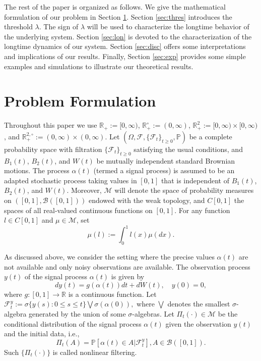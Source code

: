 \documentclass[12pt]{amsart}
\theoremstyle{remark}
\numberwithin{equation}{section}
\newcommand{\M}{\mathcal{M}}
\newcommand{\F}{\mathcal{F}}
\newcommand{\PP}{\mathbb{P}}
\newcommand{\R}{\mathbb{R}}
\numberwithin{equation}{section}
\newcommand{\1}{\boldsymbol{1}}
\begin{document}
The rest of the paper is organized as follows. We give the mathematical formulation of our problem in Section \ref{secpre}.
Section \ref{sec:thres} introduces the threshold $\lambda$. The sign of $\lambda$ will be used to characterize the longtime behavior of the underlying system.
Section \ref{sec:lon} is devoted to the characterization of the longtime dynamics of our system. Section \ref{sec:disc} offers
some interpretations and implications of our results.
Finally, Section \ref{sec:exp} provides some simple examples and simulations to illustrate our theoretical results.

\section {%
Problem
Formulation}\label{secpre}

Throughout this paper we use
$\R_+:=[0,\infty)$, $\R^\circ_+:=(0,\infty)$,
$\R_+^2:=[0,\infty) \times [0,\infty)$, and $\R^{2,\circ}_+:=(0,\infty)\times (0,\infty)$.
Let $(\Omega,\F,\{\F_t\}_{t\geq0},\PP)$ be a complete probability space with filtration $\{\F_t\}_{t\geq0}$ satisfying the usual conditions, and $B_1(t)$, $B_2(t)$, and $W(t)$ be mutually independent standard Brownian motions. The process
$\alpha(t)$ (termed a signal process) is assumed to be an adapted stochastic process taking values in $[0,1]$ that is independent of $B_1(t)$, $B_2(t)$, and $W(t)$.
Moreover, $\M$ will denote the space of probability measures on $([0,1],\mathcal B ([0,1]))$ endowed with the weak topology,
and $C[0,1]$ the spaces of all real-valued continuous functions on $[0,1]$.
For any function $l\in C[0,1]$ and $\mu\in\M$, set
$$
\mu(l):=\int_0^1 l(x)\mu(dx).
$$

As discussed above, we consider the setting where
the precise values
$\alpha(t)$ are not available and only noisy observations are available.
The observation process $y(t)$ of the signal process $\alpha(t)$
is given by
\begin{equation}\label{eq-oby}
dy(t)=g(\alpha(t))dt+dW(t),\quad y(0)=0,
\end{equation}
where $g:[0,1]\to\R$ is a continuous function.
Let
$
\F_t^y:=\sigma\{y(s):0\leq s\leq t\}\bigvee\sigma(\alpha(0)),$
where $\bigvee$ denotes the smallest $\sigma$-algebra generated by the union of some $\sigma$-algebras.
Let $\Pi_t(\cdot)\in \M$ be the conditional distribution of the signal process $\alpha(t)$ given the observation $y(t)$ and the initial data, i.e.,
$$
\Pi_t(A)=\PP[\alpha(t)\in A|\F_t^y], A\in\mathcal B([0,1]).
$$
Such $\{\Pi_t(\cdot)\}$ is called nonlinear filtering.
\end{document}
